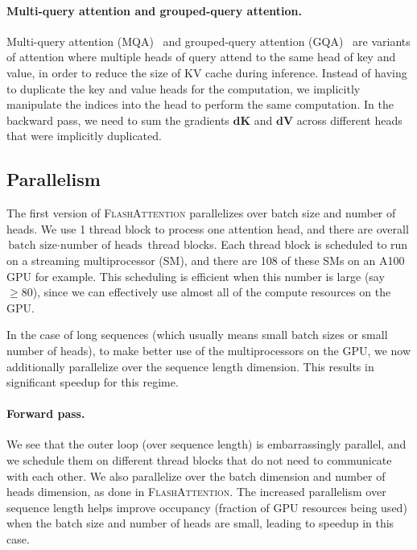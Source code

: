 \paragraph{Multi-query attention and grouped-query attention.} Multi-query attention (MQA)~\citep{shazeer2019fast} and grouped-query attention (GQA)~\citep{ainslie2023gqa} are variants of attention where multiple heads of query attend to the same head of key and value, in order to reduce the size of KV cache during inference. Instead of having to duplicate the key and value heads for the computation, we implicitly manipulate the indices into the head to perform the same computation. In the backward pass, we need to sum the gradients $\mathbf{dK}$ and $\mathbf{dV}$ across different heads that were implicitly duplicated.

\subsection{Parallelism}
\label{subsec:parallelism}

The first version of \textsc{FlashAttention} parallelizes over batch size and number of heads. We use 1 thread block to process one attention head, and there are overall
$\text{batch size} \cdot \text{number of heads}$ thread blocks. Each thread block is scheduled to run on a streaming multiprocessor (SM), and there are 108 of these SMs on an A100 GPU for example. This scheduling is efficient when this number is large (say $\geq 80$), since we can effectively use almost all of the compute resources on the GPU.

In the case of long sequences (which usually means small batch sizes or small number of heads), to make better use of the multiprocessors on the GPU, we now additionally parallelize over the sequence length dimension. This results in significant speedup for this regime.

\paragraph{Forward pass.} We see that the outer loop (over sequence length) is embarrassingly parallel, and we schedule them on different thread blocks that do not need to communicate with each other. We also parallelize over the batch dimension and number of heads dimension, as done in \textsc{FlashAttention}.
The increased parallelism over sequence length helps improve occupancy (fraction of GPU resources being used) when the batch size and number of heads are small, leading to speedup in this case.

